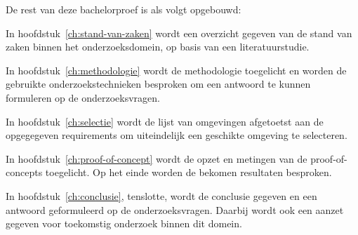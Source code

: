 
De rest van deze bachelorproef is als volgt opgebouwd:

In hoofdstuk~\ref{ch:stand-van-zaken} wordt een overzicht gegeven van de stand van zaken binnen het onderzoeksdomein,
 op basis van een literatuurstudie.

In hoofdstuk~\ref{ch:methodologie} wordt de methodologie toegelicht en worden de gebruikte onderzoekstechnieken besproken om een antwoord te kunnen formuleren 
op de onderzoeksvragen.

In hoofdstuk~\ref{ch:selectie} wordt de lijst van omgevingen afgetoetst aan de opgegegeven requirements om uiteindelijk een geschikte omgeving te selecteren.

In hoofdstuk~\ref{ch:proof-of-concept} wordt de opzet en metingen van de proof-of-concepts toegelicht. Op het einde worden de bekomen resultaten besproken.

In hoofdstuk~\ref{ch:conclusie}, tenslotte, 
wordt de conclusie gegeven en een antwoord geformuleerd op de onderzoeksvragen. 
Daarbij wordt ook een aanzet gegeven voor toekomstig onderzoek binnen dit domein.